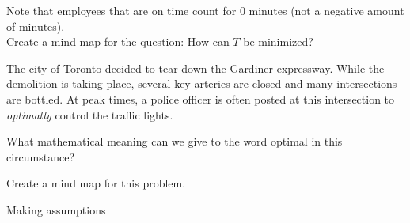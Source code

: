 Note that employees that are on time count for 0 minutes (not a negative amount of minutes). \\

Create a mind map for the question: \quad How can $T$ be minimized?


\bookonlynewpage


\question

The city of Toronto decided to tear down the Gardiner expressway. While the demolition is taking place, several key arteries are closed and many intersections are bottled. 
At peak times, a police officer is often posted at this intersection to \emph{optimally} control the traffic lights. 

\begin{parts}
	\item What mathematical meaning can we give to the word optimal in this circumstance? 
	\item Create a mind map for this problem.
\end{parts}




	









\standardonlynewpage


%
%



\begin{module}{Making assumptions}
	\label{assumption}

\begin{siam}
	
	
\end{siam}
\end{module}
	




